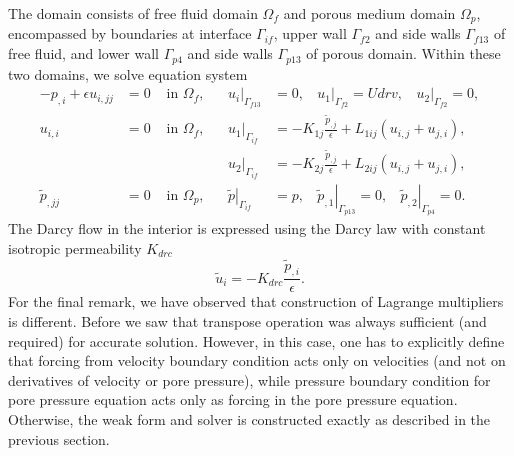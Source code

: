 \documentclass[12pt,a4paper]{article}
\newcommand{\ord}{\epsilon}
\begin{document}
The domain consists of free fluid domain $\Omega_f$ and porous medium domain $\Omega_p$, encompassed by boundaries at interface $\Gamma_{if}$, upper wall $\Gamma_{f2}$ and side walls $\Gamma_{f13}$ of free fluid, and lower wall $\Gamma_{p4}$ and side walls $\Gamma_{p13}$ of porous domain. Within these two domains, we solve equation system
\begin{align}
- p_{,i} + \ord u_{i,jj} & = 0 & \mbox{ in } \Omega_f, & & \left. u_i \right|_{\Gamma_{f13}} & = 0, \ \ \ \ \left. u_1 \right|_{\Gamma_{f2}} = Udrv, \ \ \ \ \left. u_2 \right|_{\Gamma_{f2}} = 0, \\
u_{i,i} & = 0 & \mbox{ in } \Omega_f, & & \left. u_1 \right|_{\Gamma_{if}} & = - K_{1j} \frac{\tilde{p}_{,j}}{\ord} + L_{1ij} \left( u_{i,j} + u_{j,i} \right), \\
& & & & \left. u_2 \right|_{\Gamma_{if}} & = - K_{2j} \frac{\tilde{p}_{,j}}{\ord} + L_{2ij} \left( u_{i,j} + u_{j,i} \right), \\
\tilde{p}_{,jj} & = 0 & \mbox{ in } \Omega_p, & & \left. \tilde{p} \right|_{\Gamma_{if}} & = p, \ \ \ \ \left. \tilde{p}_{,1} \right|_{\Gamma_{p13}} = 0, \ \ \ \ \left. \tilde{p}_{,2} \right|_{\Gamma_{p4}} = 0.
\end{align}
The Darcy flow in the interior is expressed using the Darcy law with constant isotropic permeability $K_{drc}$
\begin{equation}
\tilde{u}_i = - K_{drc} \frac{\tilde{p}_{,i}}{\ord} .
\end{equation}
For the final remark, we have observed that
construction of Lagrange multipliers is different. Before we saw that transpose operation was always sufficient (and required) for accurate solution. However, in this case, one has to explicitly define that forcing from velocity boundary condition acts only on velocities (and not on derivatives of velocity or pore pressure), while pressure boundary condition for pore pressure equation acts only as forcing in the pore pressure equation.
Otherwise, the weak form and solver is constructed exactly as described in the previous section.
\end{document}
